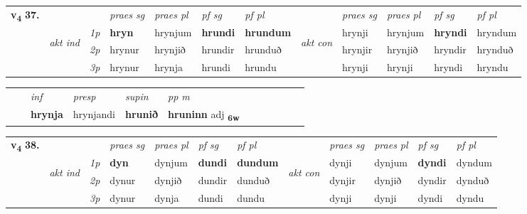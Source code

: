 \begin{tabular}{llllllllllll} \toprule
\multirow{4}{*}{{{\textbf{v{\textsubscript{4}}} \Large{\textbf{37.}}}}}  & &   &  \textit{praes sg}  & \textit{praes pl}  &\textit{ pf sg} & \textit{pf pl} &  &  \textit{praes sg}  & \textit{praes pl}  & \textit{pf sg} & \textit{pf pl } \\*
	\cmidrule{4-7} \cmidrule{9-12}
 & \multirow{3}{*}{\begin{turn}{90}\textit{akt ind}\end{turn}} & {\textit{1p}} & \textbf{hryn} & hrynjum    & \textbf{hrundi} & \textbf{hrundum} & \multirow{3}{*}{\begin{turn}{90}\textit{akt con}\end{turn}} &hrynji & hrynjum & \textbf{hryndi} & hryndum\\*
& &  {\textit{2p}} &  hrynur  & hrynjið   & hrundir & hrunduð & & hrynjir & hrynjið & hryndir & hrynduð \\*
& &  {\textit{3p}} & hrynur & hrynja   & hrundi & hrundu & & hrynji & hrynji& hryndi & hryndu  \\*
\cmidrule{4-7} \cmidrule{9-12}
\end{tabular}


\begin{tabular}{llllllllllll}
 & & \textit{inf}     & \textit{presp} & \textit{supin}  & \textit{pp m}     \\*
  & & \textbf{hrynja}      & hrynjandi &  \textbf{hrunið}  & \textbf{hruninn} adj \textbf{\textsubscript{6w}} \\*
\cmidrule{1-12}
\end{tabular}



\begin{tabular}{llllllllllll} \toprule
\multirow{4}{*}{{{\textbf{v{\textsubscript{4}}} \Large{\textbf{38.}}}}}  & &   &  \textit{praes sg}  & \textit{praes pl}  &\textit{ pf sg} & \textit{pf pl} &  &  \textit{praes sg}  & \textit{praes pl}  & \textit{pf sg} & \textit{pf pl } \\*
	\cmidrule{4-7} \cmidrule{9-12}
 & \multirow{3}{*}{\begin{turn}{90}\textit{akt ind}\end{turn}} & {\textit{1p}} & \textbf{dyn} & dynjum    & \textbf{dundi} & \textbf{dundum} & \multirow{3}{*}{\begin{turn}{90}\textit{akt con}\end{turn}} &dynji & dynjum & \textbf{dyndi} & dyndum\\*
& &  {\textit{2p}} &  dynur  & dynjið   & dundir & dunduð & & dynjir & dynjið & dyndir & dynduð \\*
& &  {\textit{3p}} & dynur & dynja   & dundi & dundu & & dynji & dynji& dyndi & dyndu  \\*
\cmidrule{4-7} \cmidrule{9-12}
\end{tabular}


